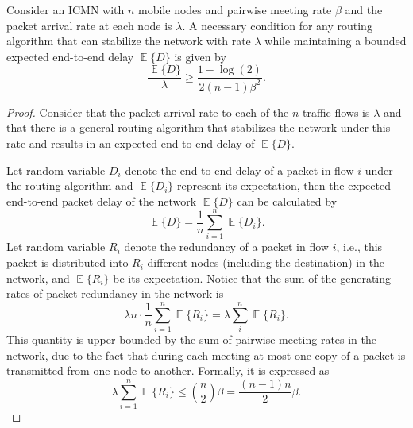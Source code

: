 \documentclass[twocolumn, 10pt]{svjour3}         \smartqed  \usepackage{graphicx}
\DeclareMathOperator*{\E}{\mathbb{E}}
\begin{document}
\begin{theorem}\label{theorem:tradeoff}
Consider an ICMN with $n$ mobile nodes and pairwise meeting rate $\beta$ and  the packet arrival rate at each node is $\lambda$.
A necessary condition for any routing algorithm that can stabilize the network with rate $\lambda$ while maintaining a bounded expected end-to-end delay $\E\{D\}$ is given by
\begin{equation}
	\frac{\E\{D\}}{\lambda} \geq \frac{1- \log(2) }{2 (n-1) \beta^2}.
\end{equation}
\end{theorem}
\begin{proof}
Consider that the packet arrival rate to each of the $n$ traffic flows is $\lambda$ and that there is a general routing algorithm that stabilizes the network under this rate and results in an expected end-to-end delay of $\E\{D\}$.

Let random variable $D_i$ denote the end-to-end delay of a packet in flow $i$ under the routing algorithm and $\E\{D_i\}$ represent its expectation, then the expected end-to-end packet delay of the  network $\E\{D\}$ can be calculated by
\begin{equation}\label{eqn:total_delay_ICN}
	\E\{D\} = \frac{1}{n} \sum_{i=1}^{n} \E\{D_i\}.
\end{equation}
Let random variable $R_i$ denote the redundancy of a packet in flow $i$, i.e., this packet is distributed into $R_i$ different nodes (including the destination) in the network, and $\E\{R_i\}$ be its expectation.
Notice that the sum of the generating rates of  packet redundancy in the network  is
\begin{equation}
 \lambda n \cdot \frac{1}{n} \sum_{i=1}^{n} \E\{R_i\}	= \lambda \sum_{i}^{n} \E\{R_i\}.
\end{equation} 
This quantity is upper bounded by the sum of pairwise meeting rates  in the network, due to the fact  that during each meeting  at most one copy of a packet is transmitted from one node to another.
Formally, it is expressed as 
\begin{equation}\label{eqn:rate_redun_ICN}
	\lambda \sum_{i=1}^{n} \E\{R_i\} \leq \binom{n}{2} \beta = \frac{(n-1)n}{2} \beta.
\end{equation}



\end{proof}
\end{document}
